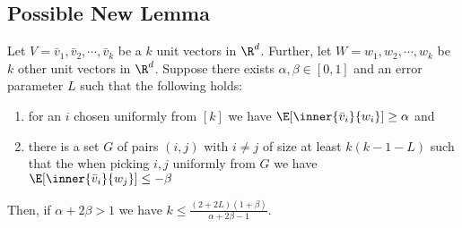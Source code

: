 
\subsection{Possible New Lemma}

\begin{lemma}
\label{lemma:new_generalized-skew-obtuse_lemma}
    Let $V= \bar{v}_1,\bar{v}_2,\cdots, \bar{v}_k$ be a $k$ unit vectors in $\R^d$. Further, let  $W = w_1,w_2,\cdots, w_k$ be $k$ other unit vectors in $\R^d$. Suppose there exists $\alpha,\beta\in [0,1]$ and an error parameter $L$ such that the following holds:
    \begin{enumerate}
        \item for an $i$ chosen uniformly from $[k]$ we have $\E[\inner{\bar{v}_i}{w_i}] \geq \alpha$ and
        \item there is a set $G$ of pairs $(i,j)$ with $i\neq j$ of size at least $k(k-1-L)$ such that the when picking $i,j$ uniformly from $G$ we have $\E[\inner{\bar{v}_i}{w_j}] \leq -\beta$
    \end{enumerate}
     Then, if $\alpha+2\beta>1$ we have $ k \leq \frac{(2+2L)(1+\beta)}{\alpha+2\beta-1}.$
\end{lemma}
